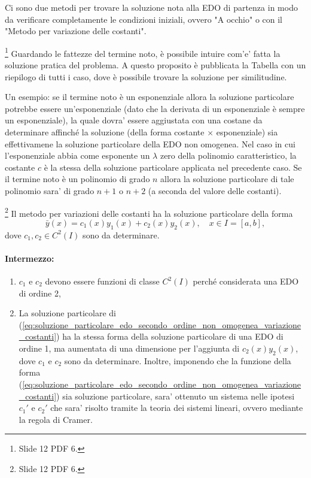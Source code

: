 Ci sono due metodi per trovare la soluzione nota alla EDO di partenza in modo da verificare completamente le condizioni iniziali, ovvero "A occhio" o con il "Metodo per variazione delle costanti".

\label{ssec:metodo_somiglianza}
\footnote{Slide 12 PDF 6.}
Guardando le fattezze del termine noto, è possibile intuire com'e' fatta la soluzione pratica del problema. A questo proposito è pubblicata la Tabella con un riepilogo di tutti i caso, dove è possibile trovare la soluzione per similitudine.

\noindent Un esempio: se il termine noto è un esponenziale allora la soluzione particolare potrebbe essere un'esponenziale (dato che la derivata di un esponenziale è sempre un esponenziale), la quale dovra' essere aggiustata con una costane da determinare affinché la soluzione (della forma costante $\times$ esponenziale) sia effettivamene la soluzione particolare della EDO non omogenea. Nel caso in cui l'esponenziale abbia come esponente un $\lambda$ zero della polinomio caratteristico, la costante $c$ è la stessa della soluzione particolare applicata nel precedente caso. Se il termine noto è un polinomio di grado $n$ allora la soluzione particolare di tale polinomio sara' di grado $n+1$ o $n+2$ (a seconda del valore delle costanti).

\label{ssec:variazione_costanti}
\footnote{Slide 12 PDF 6.}
Il metodo per variazioni delle costanti ha la soluzione particolare della forma
\begin{equation}\label{eq:soluzione_particolare_edo_secondo_ordine_non_omogenea_variazione_costanti}
	\bar{y}(x) = c_1(x) y_1(x) + c_2(x) y_2(x),\quad x\in I=[a,b],
\end{equation}
dove $c_1,c_2\in C^2(I)$ sono da determinare.

\paragraph{Intermezzo:}
\begin{enumerate}
	\item $c_1$ e $c_2$ devono essere funzioni di classe $C^2(I)$ perché considerata una EDO di ordine 2,
	\item La soluzione particolare di (\ref{eq:soluzione_particolare_edo_secondo_ordine_non_omogenea_variazione_costanti}) ha la stessa forma della soluzione particolare di una EDO di ordine 1, ma aumentata di una dimensione per l'aggiunta di $c_2(x) y_2(x)$, dove $c_1$ e $c_2$ sono da determinare. Inoltre, imponendo che la funzione della forma (\ref{eq:soluzione_particolare_edo_secondo_ordine_non_omogenea_variazione_costanti}) sia soluzione particolare, sara' ottenuto un sistema nelle ipotesi $c_1'$ e $c_2'$ che sara' risolto tramite la teoria dei sistemi lineari, ovvero mediante la regola di Cramer.
\end{enumerate}


